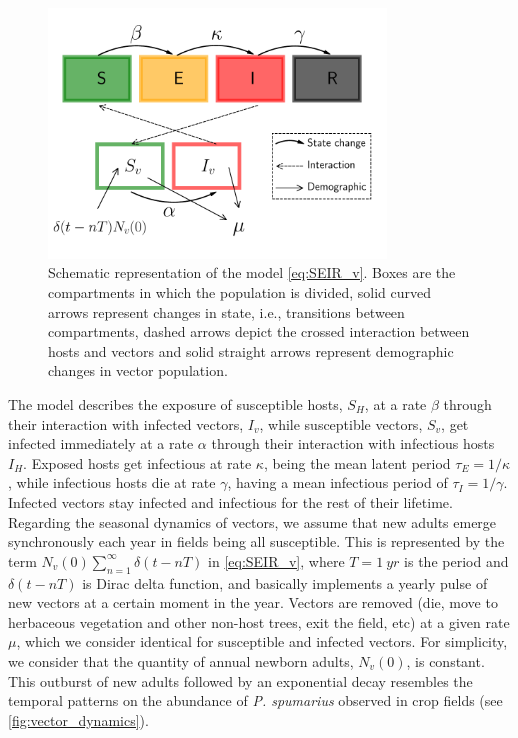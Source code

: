 \begin{figure}
    \centering
    \label{fig:model_diagram_phyto}
    \includegraphics[width=0.8\textwidth]{Figures/SEIR_v_scheme.pdf}
    \caption[Schematic representation of the model]{Schematic representation of
        the model \cref{eq:SEIR_v}. Boxes
        are the compartments in which the population is divided, solid curved
        arrows
        represent changes in state, i.e., transitions between compartments,
        dashed
        arrows depict the crossed interaction between hosts and vectors and
        solid
        straight arrows represent demographic changes in vector population.}
\end{figure}

The model describes the exposure of susceptible hosts, $S_H$, at a rate
$\beta$ through their interaction with infected vectors, $I_v$, while
susceptible vectors, $S_v$, get infected immediately at a rate $\alpha$ through
their interaction with infectious hosts $I_H$. Exposed hosts get infectious at
rate $\kappa$, being the mean latent period $\tau_E=1/\kappa$, while infectious
hosts die at rate $\gamma$, having a mean infectious period of
$\tau_I=1/\gamma$. Infected vectors stay infected and infectious for the rest
of their lifetime. Regarding the seasonal dynamics of vectors, we assume that
new adults emerge synchronously each year in fields being all susceptible. This
is represented by the term $N_v(0)\sum_{n=1}^{\infty}\delta(t-nT)$ in
\cref{eq:SEIR_v}, where $T=\SI{1}{yr}$ is the period and $\delta(t-nT)$ is
Dirac delta function, and basically implements a yearly pulse of new vectors at
a certain moment in the year. Vectors are removed (die, move to herbaceous
vegetation and other non-host trees, exit the field, etc) at a given rate
$\mu$, which we consider identical for susceptible and infected vectors. For
simplicity, we consider that the quantity of annual newborn adults, $N_v(0)$,
is constant. This outburst of new adults followed by an exponential decay
resembles the temporal patterns on the abundance of \textit{P. spumarius}
observed in crop fields  \cite{Antonatos2021,Beal2021,Cornara2017,Lopez2021}
(see \cref{fig:vector_dynamics}).

